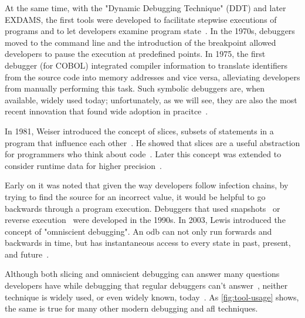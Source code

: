 At the same time, with the "Dynamic Debugging Technique" (DDT) and later EXDAMS, the first tools were developed to facilitate stepwise executions of programs and to let developers examine program state~\cite{balzer69:exdams_extendable_debugging}.
In the 1970s, debuggers moved to the command line and the introduction of the breakpoint allowed developers to pause the execution at predefined points.
In 1975, the first debugger (for COBOL) integrated compiler information to translate identifiers from the source code into memory addresses and vice versa, alleviating developers from manually performing this task.
Such symbolic debuggers are, when available, widely used today; unfortunately, as we will see, they are also the most recent innovation that found wide adoption in pracitce~\cite{perscheid17:studying_the_advancement}.

In 1981, Weiser introduced the concept of slices, subsets of statements in a program that influence each other~\cite{weiser81:program_slicing}. 
He showed that slices are a useful abstraction for programmers who think about code~\cite{weiser82:programmers_use_slices_when}.
Later this concept was extended to consider runtime data for higher precision~\cite{agrawal90:dynamic_program_slicing, korel90:dynamic_slicing_of_computer}.

Early on it was noted that given the way developers follow infection chains, by trying to find the source for an incorrect value, it would be helpful to go backwards through a program execution.
Debuggers that used snapshots~\cite{feldman88:igor_a_system} or reverse execution~\cite{lieberman95:zstep_95_a_reversible} were developed in the 1990s.
In 2003, Lewis introduced the concept of "omniscient debugging".
An \ac{odb} can not only run forwards and backwards in time, but has instantaneous access to every state in past, present, and future~\cite{lewis03:debugging_backwards_in_time}.

Although both slicing and omniscient debugging can answer many questions developers have while debugging that regular debuggers can't answer~\cite{ko07:information_needs_in_collocated, storey97:how_do_program_understanding, sillito06:questions_programmers_ask}, neither technique is widely used, or even widely known, today~\cite{perscheid17:studying_the_advancement}.
As \cref{fig:tool-usage} shows, the same is true for many other modern debugging and \ac{afl} techniques.

